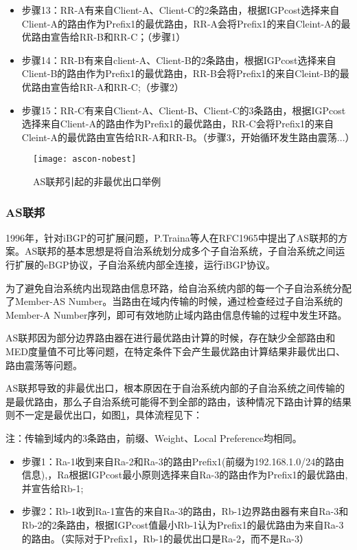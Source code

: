 \begin{itemize}
\item 步骤13：RR-A有来自Client-A、Client-C的2条路由，根据IGPcost选择来自Client-A的路由作为Prefix1的最优路由，RR-A会将Prefix1的来自Cleint-A的最优路由宣告给RR-B和RR-C；（步骤1）
\item 步骤14：RR-B有来自client-A、Client-B的2条路由，根据IGPcost选择来自Client-B的路由作为Prefix1的最优路由，RR-B会将Prefix1的来自Cleint-B的最优路由宣告给RR-A和RR-C;（步骤2）
\item 步骤15：RR-C有来自Client-A、Client-B、Client-C的3条路由，根据IGPcost选择来自Client-A的路由作为Prefix1的最优路由，RR-C会将Prefix1的来自Cleint-A的最优路由宣告给RR-A和RR-B。（步骤3，开始循环发生路由震荡...）

\end{itemize}

\begin{figure}
  \centering
  \texttt{[image: ascon-nobest]}
  \caption{AS联邦引起的非最优出口举例}
  \label{fig:ascon-nobest}
\end{figure}


\subsubsection{AS联邦\cite{rfc1965}}


1996年，针对iBGP的可扩展问题，P.Traina等人在RFC1965\cite{rfc1965}中提出了AS联邦的方案。AS联邦的基本思想是将自治系统划分成多个子自治系统，子自治系统之间运行扩展的eBGP协议，子自治系统内部全连接，运行iBGP协议。

为了避免自治系统内出现路由信息环路，给自治系统内部的每一个子自治系统分配了Member-AS Number。当路由在域内传输的时候，通过检查经过子自治系统的Member-A Number序列，即可有效地防止域内路由信息传输的过程中发生环路。






AS联邦因为部分边界路由器在进行最优路由计算的时候，存在缺少全部路由和MED度量值不可比等问题，在特定条件下会产生最优路由计算结果非最优出口、路由震荡等问题。



AS联邦导致的非最优出口\cite{rfc5065}，根本原因在于自治系统内部的子自治系统之间传输的是最优路由，那么子自治系统可能得不到全部的路由，该种情况下路由计算的结果则不一定是最优出口，如图\ref{fig:ascon-nobest}，具体流程见下：

注：传输到域内的3条路由，前缀、Weight、Local Preference均相同。

\begin{itemize}
\item 步骤1：Ra-1收到来自Ra-2和Ra-3的路由Prefix1(前缀为192.168.1.0/24的路由信息),，Ra根据IGPcost最小原则选择来自Ra-3的路由作为Prefix1的最优路由,并宣告给Rb-1;
\item 步骤2：Rb-1收到Ra-1宣告的来自Ra-3的路由，Rb-1边界路由器有来自Ra-3和Rb-2的2条路由，根据IGPcost值最小Rb-1认为Prefix1的最优路由为来自Ra-3的路由。（实际对于Prefix1，Rb-1的最优出口是Ra-2，而不是Ra-3）
\end{itemize}


